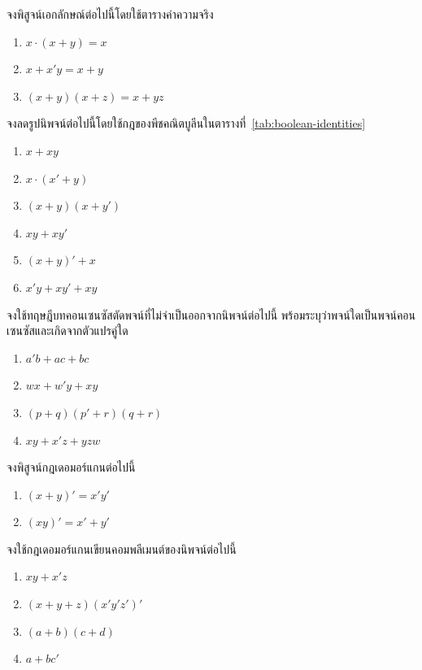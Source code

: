 \begin{exercise}
จงพิสูจน์เอกลักษณ์ต่อไปนี้โดยใช้ตารางค่าความจริง
\begin{enumerate}
    \item $x \cdot (x + y) = x$
    \item $x + x' y = x + y$
    \item $(x + y)(x + z) = x + y z$
\end{enumerate}
\end{exercise}

\begin{exercise}
จงลดรูปนิพจน์ต่อไปนี้โดยใช้กฎของพีชคณิตบูลีนในตารางที่~\ref{tab:boolean-identities}
\begin{enumerate}
    \item $x + x y$
    \item $x \cdot (x' + y)$
    \item $(x + y)(x + y')$
    \item $x y + x y'$
    \item $(x + y)' + x$
    \item $x' y + x y' + x y$
\end{enumerate}
\end{exercise}

\begin{exercise}
จงใช้ทฤษฎีบทคอนเซนซัสตัดพจน์ที่ไม่จำเป็นออกจากนิพจน์ต่อไปนี้ พร้อมระบุว่าพจน์ใดเป็นพจน์คอนเซนซัสและเกิดจากตัวแปรคู่ใด
\begin{enumerate}
    \item $a' b + a c + b c$
    \item $w x + w' y + x y$
    \item $(p + q)(p' + r)(q + r)$
    \item $x y + x' z + y z w$
\end{enumerate}
\end{exercise}

\begin{exercise}
จงพิสูจน์กฎเดอมอร์แกนต่อไปนี้
\begin{enumerate}
    \item $(x + y)' = x' y'$
    \item $(x y)' = x' + y'$
\end{enumerate}
\end{exercise}

\begin{exercise}
จงใช้กฎเดอมอร์แกนเขียนคอมพลีเมนต์ของนิพจน์ต่อไปนี้
\begin{enumerate}
    \item $x y + x' z$
    \item $(x + y + z)(x' y' z')'$
    \item $(a + b)(c + d)$
    \item $a + b c'$
\end{enumerate}
\end{exercise}

